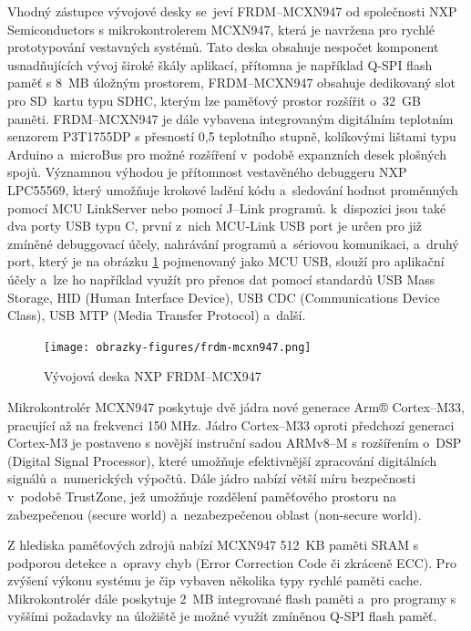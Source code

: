 Vhodný zástupce vývojové desky se~jeví FRDM--MCXN947 od společnosti NXP Semiconductors s mikrokontrolerem MCXN947, která je navržena pro rychlé prototypování vestavných systémů. Tato deska obsahuje nespočet komponent usnadňujících vývoj široké škály aplikací, přítomna je například Q-SPI flash paměť s 8~MB úložným prostorem, FRDM--MCXN947 obsahuje dedikovaný slot pro SD~kartu typu SDHC, kterým lze paměťový prostor rozšířit o~32~GB paměti. FRDM--MCXN947 je dále vybavena integrovaným digitálním teplotním senzorem P3T1755DP s přesností 0,5 teplotního stupně, kolíkovými lištami typu Arduino a~microBus pro možné rozšíření v~podobě expanzních desek plošných spojů. Významnou výhodou je přítomnost vestavěného debuggeru NXP LPC55569, který umožňuje krokové ladění kódu a~sledování hodnot proměnných pomocí MCU LinkServer nebo pomocí J--Link programů. k~dispozici jsou také dva porty USB typu C, první z~nich MCU-Link USB port je určen pro již zmíněné debuggovací účely, nahrávání programů a~sériovou komunikaci, a~druhý port, který je na obrázku \ref{fig:frdm-mcxn947} pojmenovaný jako MCU USB, slouží pro aplikační účely a~lze ho například využít pro přenos dat pomocí standardů USB Mass Storage, HID (Human Interface Device), USB CDC (Communications Device Class), USB MTP (Media Transfer Protocol) a~další.~\cite{nxp_MCX_Nx4x_Reference_Manual, nxp_FRDM_MCXN947_getting_started}

\begin{figure}[h]
    \centering
    \texttt{[image: obrazky-figures/frdm-mcxn947.png]}
    
    \caption{Vývojová deska NXP FRDM--MCX947~\cite{nxp_FRDM_MCXN947_getting_started}}
    \label{fig:frdm-mcxn947}
\end{figure}

Mikrokontrolér MCXN947 poskytuje dvě jádra nové generace Arm® Cortex--M33, pracující až na frekvenci 150 MHz. Jádro Cortex--M33 oproti předchozí generaci Cortex-M3 je postaveno s novější instruční sadou ARMv8--M s rozšířením o~DSP (Digital Signal Processor), které umožňuje efektivnější zpracování digitálních signálů a~numerických výpočtů. Dále jádro nabízí větší míru bezpečnosti v~podobě TrustZone, jež umožňuje rozdělení paměťového prostoru na zabezpečenou (secure world) a~nezabezpečenou oblast (non-secure world).~\cite{nxp_MCX_Nx4x_Reference_Manual}

Z hlediska paměťových zdrojů nabízí MCXN947 512~KB paměti SRAM s podporou detekce a~opravy chyb (Error Correction Code či zkráceně ECC). Pro zvýšení výkonu systému je čip vybaven několika typy rychlé paměti cache. Mikrokontrolér dále poskytuje 2~MB integrované flash paměti a~pro programy s vyššími požadavky na úložiště je možné využít zmíněnou Q-SPI flash paměť.~\cite{nxp_MCX_Nx4x_Reference_Manual}

